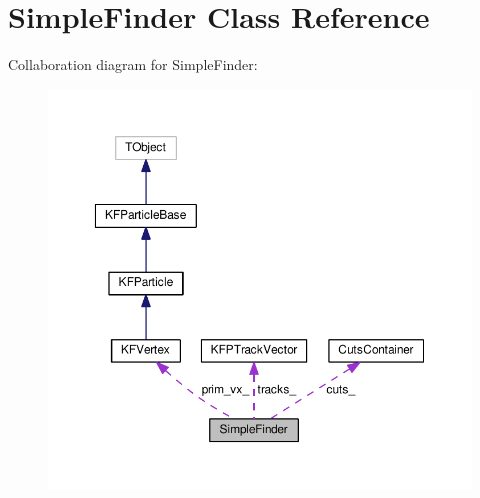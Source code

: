 \hypertarget{classSimpleFinder}{}\section{Simple\+Finder Class Reference}
\label{classSimpleFinder}


Collaboration diagram for Simple\+Finder\+:
\nopagebreak
\begin{figure}[H]
\begin{center}
\leavevmode
\includegraphics[width=350pt]{classSimpleFinder__coll__graph}
\end{center}
\end{figure}
